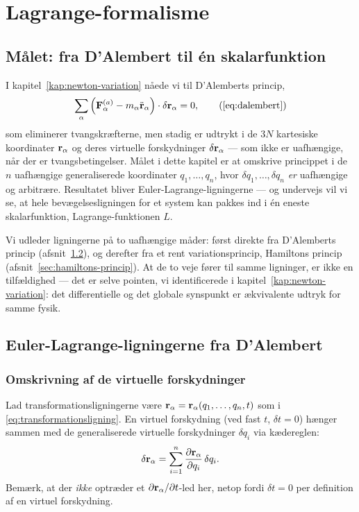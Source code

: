 
\chapter{Lagrange-formalisme}
\label{kap:lagrange}

\section{Målet: fra D'Alembert til én skalarfunktion}

I kapitel~\ref{kap:newton-variation} nåede vi til D'Alemberts princip,
\begin{equation}
  \sum_\alpha \left(\vb{F}_\alpha^{(a)} - m_\alpha\ddot{\vb{r}}_\alpha\right)\cdot\delta\vb{r}_\alpha = 0,
  \tag{\ref*{eq:dalembert}}
\end{equation}
som eliminerer tvangskræfterne, men stadig er udtrykt i de $3N$
kartesiske koordinater $\vb{r}_\alpha$ og deres virtuelle forskydninger
$\delta\vb{r}_\alpha$ — som ikke er uafhængige, når der er
tvangsbetingelser. Målet i dette kapitel er at omskrive princippet i de
$n$ uafhængige generaliserede koordinater $q_1,\dots,q_n$, hvor
$\delta q_1,\dots,\delta q_n$ \emph{er} uafhængige og arbitrære.
Resultatet bliver Euler-Lagrange-ligningerne — og undervejs vil vi se,
at hele bevægelsesligningen for et system kan pakkes ind i én eneste
skalarfunktion, Lagrange-funktionen $L$.

Vi udleder ligningerne på to uafhængige måder: først direkte fra
D'Alemberts princip (afsnit~\ref{sec:el-fra-dalembert}), og derefter fra
et rent variationsprincip, Hamiltons princip
(afsnit~\ref{sec:hamiltons-princip}). At de to veje fører til samme
ligninger, er ikke en tilfældighed — det er selve pointen, vi
identificerede i kapitel~\ref{kap:newton-variation}: det differentielle
og det globale synspunkt er ækvivalente udtryk for samme fysik.

\section{Euler-Lagrange-ligningerne fra D'Alembert}
\label{sec:el-fra-dalembert}

\subsection{Omskrivning af de virtuelle forskydninger}

Lad transformationsligningerne være $\vb{r}_\alpha =
\vb{r}_\alpha(q_1,\dots,q_n,t)$ som i \eqref{eq:transformationsligning}.
En virtuel forskydning (ved fast $t$, $\delta t=0$) hænger sammen med
de generaliserede virtuelle forskydninger $\delta q_i$ via kædereglen:
\begin{equation}
  \delta\vb{r}_\alpha = \sum_{i=1}^n \pdv{\vb{r}_\alpha}{q_i}\,\delta q_i.
  \label{eq:delta-r-kaederegel}
\end{equation}
Bemærk, at der \emph{ikke} optræder et $\partial\vb{r}_\alpha/\partial t$-led
her, netop fordi $\delta t=0$ per definition af en virtuel forskydning.

